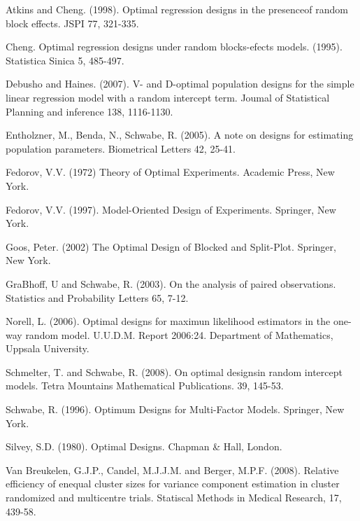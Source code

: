  \vspace{1cm}
 
\begin{thebibliography}{10}
 {Atkins and Cheng.} {(1998).} {Optimal regression
designs in the presenceof random block effects.} {JSPI 77, 321-335}.

 {Cheng.} {Optimal regression designs under random
blocks-efects models.} {(1995).} {Statistica Sinica 5, 485-497}.

 {Debusho and Haines.} {(2007).} {V- and D-optimal
population designs for the simple linear regression model with a random
intercept term.} {Joumal of Statistical Planning and inference 138,
1116-1130}.

 {Entholzner, M., Benda, N., Schwabe, R.} {(2005).}
{A note on designs for estimating population parameters.} {Biometrical
Letters 42, 25-41}.

 {Fedorov, V.V.} {(1972)} {Theory of Optimal Experiments.}
{Academic Press, New York}.

 {Fedorov, V.V.} {(1997).} {Model-Oriented Design
of Experiments.} {Springer, New York}.

 {Goos, Peter.} {(2002)} {The Optimal Design of
Blocked and Split-Plot.} {Springer, New York}.

 {GraBhoff, U and Schwabe, R.} {(2003).} {On the
analysis of paired observations.} {Statistics and Probability Letters
65, 7-12}.

 {Norell, L.} {(2006).} {Optimal designs for maximun
likelihood estimators in the one-way random model. U.U.D.M.} {Report
2006:24. Department of Mathematics, Uppsala University}.

 {Schmelter, T. and Schwabe, R.} {(2008).} {On
optimal designsin random intercept models.} {Tetra Mountains Mathematical
Publications. 39, 145-53}.

 {Schwabe, R.} {(1996).} {Optimum Designs for Multi-Factor
Models.} {Springer, New York}.

 {Silvey, S.D.} {(1980).} {Optimal Designs.} {Chapman
\& Hall, London}.

 {Van Breukelen, G.J.P., Candel, M.J.J.M. and Berger,
M.P.F.} {(2008).} {Relative efficiency of enequal cluster sizes
for variance component estimation in cluster randomized and multicentre
trials.} {Statiscal Methods in Medical Research, 17, 439-58}.\end{thebibliography}

